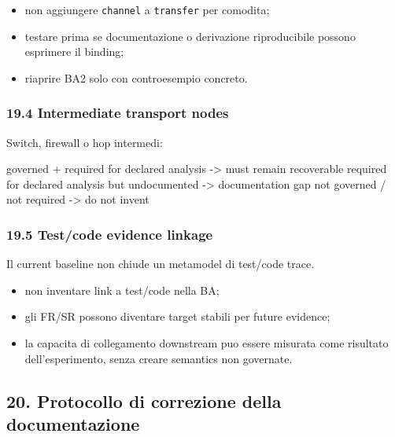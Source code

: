 \documentclass[
  9pt,
  a4paper,
]{article}
\newenvironment{Shaded}{}{}
\newcommand{\NormalTok}[1]{#1}
\providecommand{\tightlist}{%
  \setlength{\itemsep}{0pt}\setlength{\parskip}{0pt}}
\begin{document}
\begin{itemize}
\tightlist
\item
  non aggiungere \texttt{channel} a \texttt{transfer} per comodita;
\item
  testare prima se documentazione o derivazione riproducibile possono
  esprimere il binding;
\item
  riaprire BA2 solo con controesempio concreto.
\end{itemize}

\subsubsection{19.4 Intermediate transport
nodes}\label{intermediate-transport-nodes}

Switch, firewall o hop intermedi:

\begin{Shaded}
\begin{Highlighting}[]
\NormalTok{governed + required for declared analysis {-}\textgreater{} must remain recoverable}
\NormalTok{required for declared analysis but undocumented {-}\textgreater{} documentation gap}
\NormalTok{not governed / not required {-}\textgreater{} do not invent}
\end{Highlighting}
\end{Shaded}

\subsubsection{19.5 Test/code evidence
linkage}\label{testcode-evidence-linkage}

Il current baseline non chiude un metamodel di test/code trace.

\begin{itemize}
\tightlist
\item
  non inventare link a test/code nella BA;
\item
  gli FR/SR possono diventare target stabili per future evidence;
\item
  la capacita di collegamento downstream puo essere misurata come
  risultato dell'esperimento, senza creare semantics non governate.
\end{itemize}

\subsection{20. Protocollo di correzione della
documentazione}\label{protocollo-di-correzione-della-documentazione}
\end{document}
